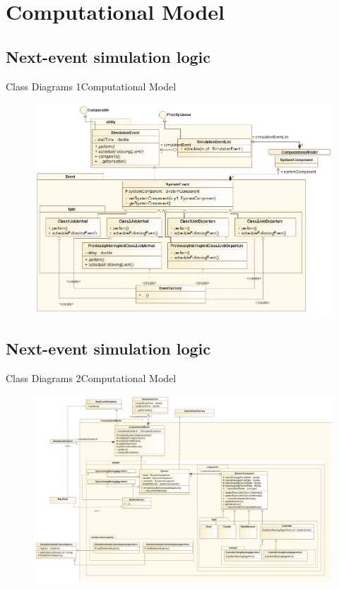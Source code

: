 \documentclass[10pt]{beamer}
\begin{document}
\section{Computational Model}
\subsection{Next-event simulation logic}
\begin{frame}[fragile]{Class Diagrams 1}{Computational Model}
\begin{figure}
\centering
\includegraphics[width=\textwidth]{./images/ClassDiagramEvent.png}
\label{fig:Concorrente}
\end{figure}


\end{frame}

\subsection{Next-event simulation logic}
\begin{frame}[fragile]{Class Diagrams 2}{Computational Model}
\begin{figure}
\centering
\includegraphics[width=\textwidth]{./images/ClassDiagram.png}
\label{fig:Concorrente}
\end{figure}


\end{frame}
\end{document}
